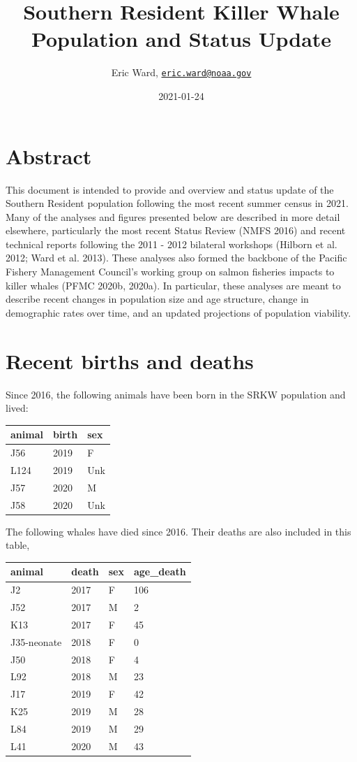 \documentclass[]{article}
\title{Southern Resident Killer Whale Population and Status Update}
\author{Eric Ward,
\href{mailto:eric.ward@noaa.gov}{\nolinkurl{eric.ward@noaa.gov}}}
\date{2021-01-24}
\begin{document}
\maketitle

\hypertarget{abstract}{%
\section{Abstract}\label{abstract}}

This document is intended to provide and overview and status update of
the Southern Resident population following the most recent summer census
in 2021. Many of the analyses and figures presented below are described
in more detail elsewhere, particularly the most recent Status Review
(NMFS 2016) and recent technical reports following the 2011 - 2012
bilateral workshops (Hilborn et al. 2012; Ward et al. 2013). These
analyses also formed the backbone of the Pacific Fishery Management
Council's working group on salmon fisheries impacts to killer whales
(PFMC 2020b, 2020a). In particular, these analyses are meant to describe
recent changes in population size and age structure, change in
demographic rates over time, and an updated projections of population
viability.

\hypertarget{recent-births-and-deaths}{%
\section{Recent births and deaths}\label{recent-births-and-deaths}}

Since 2016, the following animals have been born in the SRKW population
and lived:

\begin{longtable}[]{@{}lll@{}}
\toprule
animal & birth & sex\tabularnewline
\midrule
\endhead
J56 & 2019 & F\tabularnewline
L124 & 2019 & Unk\tabularnewline
J57 & 2020 & M\tabularnewline
J58 & 2020 & Unk\tabularnewline
\bottomrule
\end{longtable}

The following whales have died since 2016. Their deaths are also
included in this table,

\begin{longtable}[]{@{}llll@{}}
\toprule
animal & death & sex & age\_death\tabularnewline
\midrule
\endhead
J2 & 2017 & F & 106\tabularnewline
J52 & 2017 & M & 2\tabularnewline
K13 & 2017 & F & 45\tabularnewline
J35-neonate & 2018 & F & 0\tabularnewline
J50 & 2018 & F & 4\tabularnewline
L92 & 2018 & M & 23\tabularnewline
J17 & 2019 & F & 42\tabularnewline
K25 & 2019 & M & 28\tabularnewline
L84 & 2019 & M & 29\tabularnewline
L41 & 2020 & M & 43\tabularnewline
\bottomrule
\end{longtable}
\end{document}
